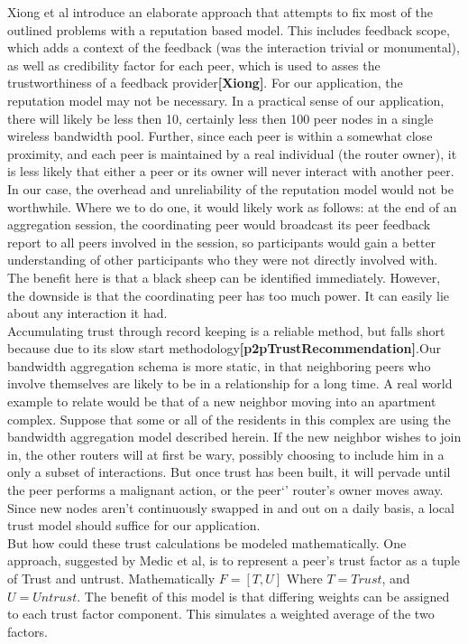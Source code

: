 \documentclass[12pt]{article}
\newcommand{\lcite}[1]
{{\bfseries\color{orange}[#1]}}
\begin{document}
			Xiong et al introduce an elaborate approach that attempts to fix most of the outlined problems with a reputation based model. This includes feedback scope, which adds a context of the feedback (was the interaction trivial or monumental), as well as credibility factor for each peer, which is used to asses the trustworthiness of a feedback provider\lcite{Xiong}. For our application, the reputation model may not be necessary. In a practical sense of our application, there will likely be less then 10, certainly less then 100 peer nodes in a single wireless bandwidth pool. Further, since each peer is within a somewhat close proximity, and each peer is maintained by a real individual (the router owner), it is less likely that either a peer or its owner will never interact with another peer. In our case, the overhead and unreliability of the reputation model would not be worthwhile. Where we to do one, it would likely work as follows: at the end of an aggregation session, the coordinating peer would broadcast its peer feedback report to all peers involved in the session, so participants would gain a better understanding of other participants who they were not directly involved with. The benefit here is that a black sheep can be identified immediately. However, the downside is that the coordinating peer has too much power. It can easily lie about any interaction it had.\\

			Accumulating trust through record keeping is a reliable method, but falls short because due to its slow start methodology\lcite{p2pTrustRecommendation}.Our bandwidth aggregation schema is more static, in that neighboring peers who involve themselves are likely to be in a relationship for a long time. A real world example to relate would be that of a new neighbor moving into an apartment complex. Suppose that some or all of the residents in this complex are using the bandwidth aggregation model described herein. If the new neighbor wishes to join in, the other routers will at first be wary, possibly choosing to include him in a only a subset of interactions. But once trust has been built, it will pervade until the peer performs a malignant action, or the peer`' router's owner moves away. Since new nodes aren't continuously swapped in and out on a daily basis, a local trust model should suffice for our application.\\

			But how could these trust calculations be modeled mathematically. One approach, suggested by Medic et al, is to represent a peer's trust factor as a tuple of Trust and untrust. Mathematically $F = [T,U] $ Where $T = Trust$, and $U = Untrust$. The benefit of this model is that differing weights can be assigned to each trust factor component. This simulates a weighted average of the two factors. \\
\end{document}
